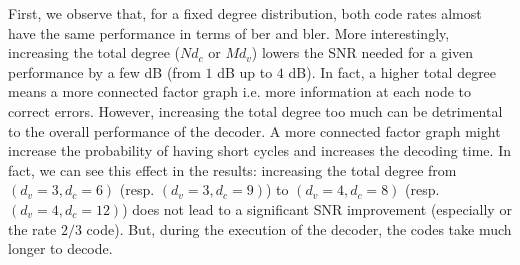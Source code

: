 First, we observe that, for a fixed degree distribution, both code rates almost
have the same performance in terms of \acrshort{ber} and \acrshort{bler}. More
interestingly, increasing the total degree ($N d_c$ or $M d_v$) lowers the SNR
needed for a given performance by a few dB (from $1$ dB up to $4$ dB). In fact,
a higher total degree means a more connected factor graph i.e. more information
at each node to correct errors. However, increasing the total degree too much
can be detrimental to the overall performance of the decoder. A more connected
factor graph might increase the probability of having short cycles and increases
the decoding time. In fact, we can see this effect in the results: increasing
the total degree from $(d_v=3, d_c=6)$ (resp.  $(d_v=3, d_c=9)$) to $(d_v=4,
    d_c=8)$ (resp.  $(d_v=4, d_c=12)$) does not lead to a significant SNR
improvement (especially or the rate $2/3$ code). But, during the execution of
the decoder, the codes take much longer to decode.
